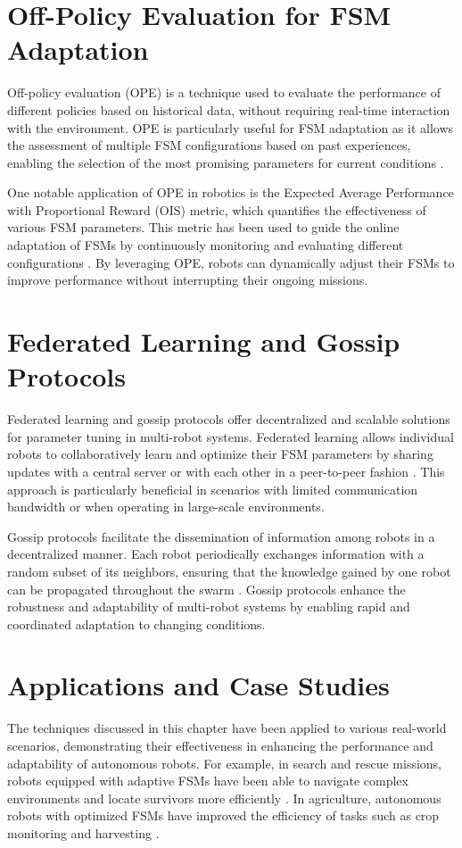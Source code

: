 \documentclass{ULBreport}
\begin{document}
\section{Off-Policy Evaluation for FSM Adaptation}
Off-policy evaluation (OPE) is a technique used to evaluate the performance of different policies based on historical data, without requiring real-time interaction with the environment. OPE is particularly useful for FSM adaptation as it allows the assessment of multiple FSM configurations based on past experiences, enabling the selection of the most promising parameters for current conditions \cite{Precup2001}.

One notable application of OPE in robotics is the Expected Average Performance with Proportional Reward (OIS) metric, which quantifies the effectiveness of various FSM parameters. This metric has been used to guide the online adaptation of FSMs by continuously monitoring and evaluating different configurations \cite{Thomas2015}. By leveraging OPE, robots can dynamically adjust their FSMs to improve performance without interrupting their ongoing missions.

\section{Federated Learning and Gossip Protocols}
Federated learning and gossip protocols offer decentralized and scalable solutions for parameter tuning in multi-robot systems. Federated learning allows individual robots to collaboratively learn and optimize their FSM parameters by sharing updates with a central server or with each other in a peer-to-peer fashion \cite{Konevcny2016}. This approach is particularly beneficial in scenarios with limited communication bandwidth or when operating in large-scale environments.

Gossip protocols facilitate the dissemination of information among robots in a decentralized manner. Each robot periodically exchanges information with a random subset of its neighbors, ensuring that the knowledge gained by one robot can be propagated throughout the swarm \cite{Kempe2003}. Gossip protocols enhance the robustness and adaptability of multi-robot systems by enabling rapid and coordinated adaptation to changing conditions.

\section{Applications and Case Studies}
The techniques discussed in this chapter have been applied to various real-world scenarios, demonstrating their effectiveness in enhancing the performance and adaptability of autonomous robots. For example, in search and rescue missions, robots equipped with adaptive FSMs have been able to navigate complex environments and locate survivors more efficiently \cite{Murphy2008}. In agriculture, autonomous robots with optimized FSMs have improved the efficiency of tasks such as crop monitoring and harvesting \cite{Bechar2016}.
\end{document}
